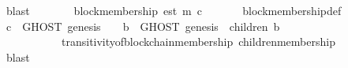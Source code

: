 \begin{isabellebody}
\ blast\ \isanewline
\ \ \ \isamarkupfalse%
\ \isamarkupfalse%
\ {\isachardoublequoteopen}block{\isacharunderscore}membership\ {\isacharparenleft}est\ m{\isacharparenright}\ c{\isachardoublequoteclose}\isanewline
\ \ \ \ \ \isamarkupfalse%
\ block{\isacharunderscore}membership{\isacharunderscore}def\isanewline
\ \ \ \ \ \isamarkupfalse%
\ {\isacartoucheopen}c\ {\isasymin}\ GHOST\ {\isacharparenleft}{\isacharbraceleft}genesis{\isacharbraceright}{\isacharcomma}\ {\isasymsigma}{\isacharprime}{\isacharparenright}\ {\isasymunion}\ {\isacharparenleft}{\isasymUnion}\ b\ {\isasymin}\ GHOST\ {\isacharparenleft}{\isacharbraceleft}genesis{\isacharbraceright}{\isacharcomma}\ {\isasymsigma}{\isacharprime}{\isacharparenright}{\isachardot}\ children\ {\isacharparenleft}b{\isacharcomma}\ {\isasymsigma}{\isacharprime}{\isacharparenright}{\isacharparenright}{\isacartoucheclose}\ \ \isanewline
\ \ \ \ \ \ \ \ \ \ \ transitivity{\isacharunderscore}of{\isacharunderscore}blockchain{\isacharunderscore}membership\ children{\isacharunderscore}membership\isanewline
\ \ \ \ \ \isamarkupfalse%
\ blast\isanewline
\ \isamarkupfalse%
\isanewline
{}\isamarkupfalse%
%
\endisatagproof
{\isafoldproof}%
%
\isadelimproof
\isanewline
%
\endisadelimproof
%
\isadelimtheory
\isanewline
%
\endisadelimtheory
%
\isatagtheory
{}\isamarkupfalse%
%
\endisatagtheory
{\isafoldtheory}%
%
\isadelimtheory
%
\endisadelimtheory
%
\end{isabellebody}%
\endinput
